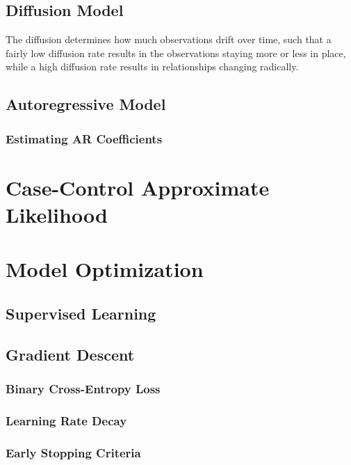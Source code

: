     \subsection{Diffusion Model}
    
    
        The diffusion determines how much observations drift over time, such that a fairly low diffusion rate results in the observations staying more or less in place, while a high diffusion rate results in relationships changing radically.
        
    
    \subsection{Autoregressive Model}
    
    \subsubsection{Estimating AR Coefficients}

\section{Case-Control Approximate Likelihood}

\section{Model Optimization}
    
    \subsection{Supervised Learning}

    \subsection{Gradient Descent}

    \subsubsection{Binary Cross-Entropy Loss}
    
    \subsubsection{Learning Rate Decay}
    
    \subsubsection{Early Stopping Criteria}
